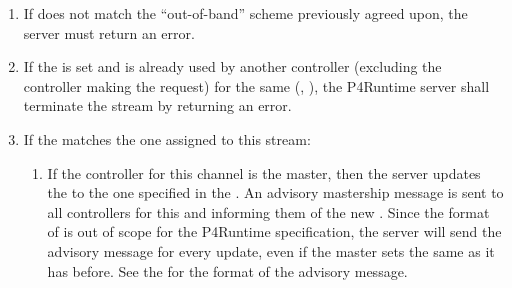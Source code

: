 \documentclass[11pt]{article}
\begin{document}
{\begin{enumerate}
\begin{enumerate}
\item{}
If  does not match the \textquotedblleft{}out-of-band\textquotedblright{} scheme previously
agreed upon, the server must return an  error.%

\item{}
If the  is set and is already used by another controller
(excluding the controller making the request) for the same
(, ), the P4Runtime server shall terminate the stream
by returning an  error.%

\item{}
If the  matches the one assigned to this stream:%

\begin{enumerate}%

\item{}
If the controller for this channel is the master, then the server
updates the  to the one specified in the
. An advisory mastership message is sent to
all controllers for this  and  informing
them of the new .  Since the format of  is
out of scope for the P4Runtime specification, the server will send
the advisory message for every update, even if the master sets the
same  as it has before. See the
 for the format of
the advisory message.%


\end{enumerate}
\end{enumerate}
\end{enumerate}}
\end{document}
